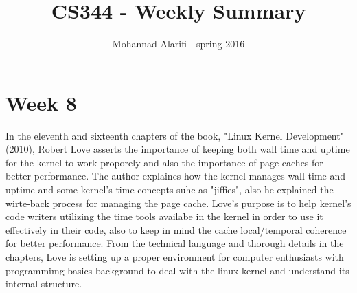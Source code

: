 \documentclass[draftclsnofoot,onecolumn]{IEEEtran}
\begin{document}
\title{CS344 - Weekly Summary}
\author{Mohannad Alarifi - spring 2016}
\maketitle
\section*{Week 8}
In the eleventh and sixteenth chapters of the book, "Linux Kernel Development"(2010)\cite{Love:2010:LKD:1855096}, Robert Love asserts
the importance of keeping both wall time and uptime for the kernel to work proporely and also the importance of page caches for better performance.
The author explaines how the kernel manages wall time and uptime and some kernel's time concepts suhc as "jiffies", also he explained the wirte-back process for managing the page cache.
Love's purpose is to help kernel's code writers utilizing the time tools availabe in the kernel in order to use it effectively in their code, also to keep in mind the cache local/temporal coherence for better performance. 
From the technical language and thorough details in the chapters, Love is setting up a proper environment for computer enthusiasts with programmimg basics background to deal with the linux kernel and understand its internal structure. 
{}

\end{document}
